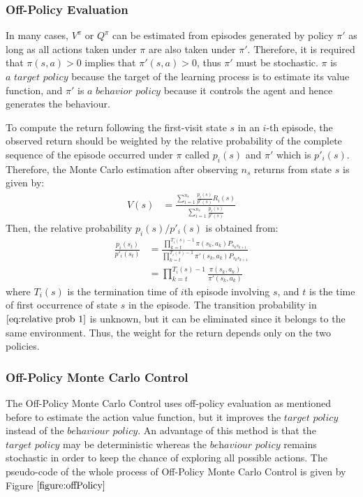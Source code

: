 \documentclass[paper=a4, fontsize=11pt]{scrartcl}
\numberwithin{equation}{section}		%
\numberwithin{figure}{section}			%
\numberwithin{table}{section}				%
\begin{document}
\subsubsection*{Off-Policy Evaluation}
In many cases, $V^\pi$ or $Q^\pi$ can be estimated from episodes generated by policy $\pi'$ as long as all actions taken under $\pi$ are also taken under $\pi'$. Therefore, it is required that $\pi(s,a)>0$ implies that $\pi'(s,a)>0$, thus $\pi'$ must be stochastic. $\pi$ is $\textit{a target policy}$ because the target of the learning process is to estimate its value function, and $\pi'$ is $\textit{a behavior policy}$ because it controls the agent and hence generates the behaviour.

To compute the return following the first-visit state $s$ in an  $i$-th episode, the observed return should be weighted by the relative probability of the complete sequence of the episode occurred under $\pi$ called $p_i(s)$ and $\pi'$ which is $p'_i(s)$. Therefore, the Monte Carlo estimation after observing $n_s$ returns from state $s$ is given by:
\begin{align}
V(s) &= \frac{\sum_{i=1}^{n_s}\frac{p_i(s)}{p'(s)}R_i(s)}{\sum_{i=1}^{n_s}\frac{p_i(s)}{p'(s)}}
\end{align} 
Then, the relative probability $p_i(s)/p'_i(s)$ is obtained from:
\begin{align}
\frac{p_i(s_t)}{p'_i(s_t)} &= \frac{\prod_{k=t}^{T_i(s)-1}\pi(s_k,a_k)P_{s_ks_{k+1}}}{\prod_{k=t}^{T_i(s)-1}\pi'(s_k,a_k)P_{s_ks_{k+1}}} \label{eq:relative prob 1} \\
&= \prod_{k=t}^{T_i(s)-1}\frac{\pi(s_k,a_k)}{\pi'(s_k,a_k)} 
\end{align}
where $T_i(s)$ is the termination time of $i$th episode involving $s$, and $t$ is the time of first occurrence of state $s$ in the episode. The transition probability in $\eqref{eq:relative prob 1}$ is unknown, but it can be eliminated since it belongs to the same environment. Thus, the weight for the return depends only on the two policies.

\subsubsection*{Off-Policy Monte Carlo Control}
The Off-Policy Monte Carlo Control uses off-policy evaluation as mentioned before to estimate the action value function, but it improves the $\textit{target policy}$ instead of the $\textit{behaviour policy}$. An advantage of this method is that the $\textit{target policy}$ may be deterministic whereas the $\textit{behaviour policy}$ remains stochastic in order to keep the chance of exploring all possible actions. The pseudo-code of the whole process of Off-Policy Monte Carlo Control is given by Figure $\ref{figure:offPolicy}$
\end{document}

